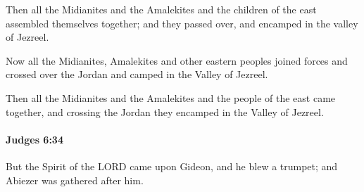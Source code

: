 			\begin{versebox}
					\item[BHS] 
					\item[ASV] Then all the Midianites and the Amalekites and the children of the east assembled themselves together; and they passed over, and encamped in the valley of Jezreel.
					\item[NIV] Now all the Midianites, Amalekites and other eastern peoples joined forces and crossed over the Jordan and camped in the Valley of Jezreel.
					\item[NRSV] Then all the Midianites and the Amalekites and the people of the east came together, and crossing the Jordan they encamped in the Valley of Jezreel.
			\end{versebox}

		\paragraph{Judges 6:34} %
			\label{JUDGES-6-34}

			But the Spirit of the LORD came upon Gideon, and he blew a trumpet; and Abiezer was gathered after him.

